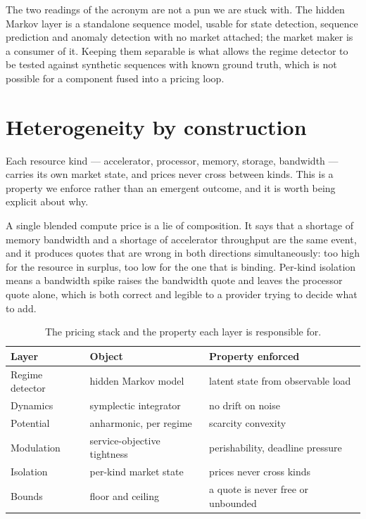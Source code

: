 \documentclass[11pt,a4paper]{article}
\begin{document}
\begin{remark}
The two readings of the acronym are not a pun we are stuck with. The hidden
Markov layer is a standalone sequence model, usable for state detection, sequence
prediction and anomaly detection with no market attached; the market maker is a
consumer of it. Keeping them separable is what allows the regime detector to be
tested against synthetic sequences with known ground truth, which is not possible
for a component fused into a pricing loop.
\end{remark}

\section{Heterogeneity by construction}

Each resource kind --- accelerator, processor, memory, storage, bandwidth ---
carries its own market state, and prices never cross between kinds. This is a
property we enforce rather than an emergent outcome, and it is worth being
explicit about why.

A single blended compute price is a lie of composition. It says that a shortage
of memory bandwidth and a shortage of accelerator throughput are the same event,
and it produces quotes that are wrong in both directions simultaneously: too high
for the resource in surplus, too low for the one that is binding. Per-kind
isolation means a bandwidth spike raises the bandwidth quote and leaves the
processor quote alone, which is both correct and legible to a provider trying to
decide what to add.

\begin{table}[h]
\centering
\begin{tabular}{lll}
\toprule
Layer & Object & Property enforced \\
\midrule
Regime detector & hidden Markov model & latent state from observable load \\
Dynamics & symplectic integrator & no drift on noise \\
Potential & anharmonic, per regime & scarcity convexity \\
Modulation & service-objective tightness & perishability, deadline pressure \\
Isolation & per-kind market state & prices never cross kinds \\
Bounds & floor and ceiling & a quote is never free or unbounded \\
\bottomrule
\end{tabular}
\caption{The pricing stack and the property each layer is responsible for.}
\end{table}
\end{document}
